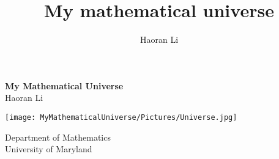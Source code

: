 \documentclass[a4paper,10pt]{book}
\title{My mathematical universe}
\author{Haoran Li}
\date{}
\begin{document}
\sloppy %



\begin{titlepage}
\begin{center}
\vspace*{1cm}
\Huge
\textbf{My Mathematical Universe} \\
\vspace{1cm}
\Large
Haoran Li \\
\vspace{3cm}
\begin{center}
\texttt{[image: MyMathematicalUniverse/Pictures/Universe.jpg]}
\end{center}
\vspace{5cm}
Department of Mathematics\\
University of Maryland\\
\end{center}
\end{titlepage}



\tableofcontents
\let\tableofcontents\relax
\newpage




\newpage






\printindex
\end{document}
